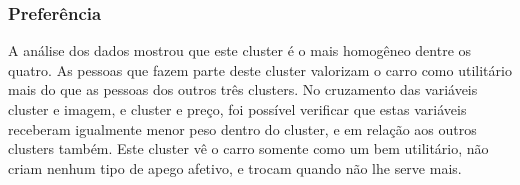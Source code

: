 \subsubsection{Preferência}
A análise dos dados mostrou que este cluster é o mais homogêneo dentre os quatro. As pessoas que fazem
parte deste cluster valorizam o carro como utilitário mais do que
as pessoas dos outros três clusters. No cruzamento das variáveis cluster
e imagem, e cluster e preço, foi possível verificar que estas variáveis
receberam igualmente menor peso dentro do cluster, e em relação aos
outros clusters também. Este cluster vê o carro somente como um bem
utilitário, não criam nenhum tipo de apego afetivo, e trocam quando
não lhe serve mais. 
